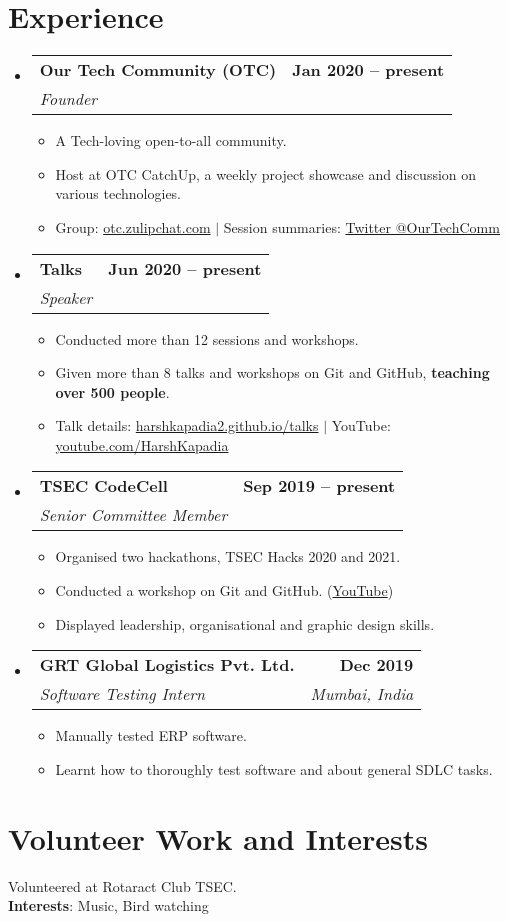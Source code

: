 \documentclass[letterpaper,11pt]{article}
\makeatletter
\newcommand{\resumeItem}[1]{
  \item\small{
    {#1 \vspace{-2pt}}
  }
}
\newcommand{\resumeSubheading}[4]{
  \vspace{-2pt}\item
    \begin{tabular*}{1.0\textwidth}[t]{l@{\extracolsep{\fill}}r}
      \textbf{#1} & \textbf{\small #2} \\
      \textit{\small#3} & \textit{\small #4} \\
    \end{tabular*}\vspace{-7pt}
}
\newcommand{\resumeSubHeadingListStart}{\begin{itemize}[leftmargin=0.0in, label={}]}
\newcommand{\resumeSubHeadingListEnd}{\end{itemize}}
\newcommand{\resumeItemListStart}{\begin{itemize}}
\newcommand{\resumeItemListEnd}{\end{itemize}\vspace{-5pt}}
\makeatother
\begin{document}
\section{Experience}
    \resumeSubHeadingListStart
        \resumeSubheading
            {Our Tech Community (OTC)}{Jan 2020 -- present}
            {Founder}{}
            \resumeItemListStart
                \resumeItem{A Tech-loving open-to-all community.}
                \resumeItem{Host at OTC CatchUp, a weekly project showcase and discussion on various technologies.}
                \resumeItem{Group: \href{https://otc.zulipchat.com/}{otc.zulipchat.com} $|$ Session summaries: \href{https://twitter.com/OurTechComm}{Twitter @OurTechComm}}
            \resumeItemListEnd
    
        \resumeSubheading
            {Talks}{Jun 2020 -- present}
            {Speaker}{}
            \resumeItemListStart
                \resumeItem{Conducted more than 12 sessions and workshops.}
                \resumeItem{Given more than 8 talks and workshops on Git and GitHub, \textbf{teaching over 500 people}.}
                \resumeItem{Talk details: \href{https://harshkapadia2.github.io/talks/}{harshkapadia2.github.io/talks} $|$ YouTube: \href{https://www.youtube.com/HarshKapadia}{youtube.com/HarshKapadia}}
            \resumeItemListEnd
    
        \resumeSubheading
            {TSEC CodeCell}{Sep 2019 -- present}
            {Senior Committee Member}{}
            \resumeItemListStart
                \resumeItem{Organised two hackathons, TSEC Hacks 2020 and 2021.}
                \resumeItem{Conducted a workshop on Git and GitHub. (\href{https://www.youtube.com/watch?v=ArOKEf8nkfw}{YouTube})}
                \resumeItem{Displayed leadership, organisational and graphic design skills.}
            \resumeItemListEnd
    
        \resumeSubheading
            {GRT Global Logistics Pvt. Ltd.}{Dec 2019}
            {Software Testing Intern}{Mumbai, India}
            \resumeItemListStart
                \resumeItem{Manually tested ERP software.}
                \resumeItem{Learnt how to thoroughly test software and about general SDLC tasks.}
            \resumeItemListEnd
    \resumeSubHeadingListEnd
\vspace{-16pt}


\section{Volunteer Work and Interests}
    \begin{itemize}[leftmargin=0.2in, label={}]
    {\item{
        Volunteered at Rotaract Club TSEC. \\
        \textbf{Interests}: Music, Bird watching
    }}
    \end{itemize}
\end{document}
